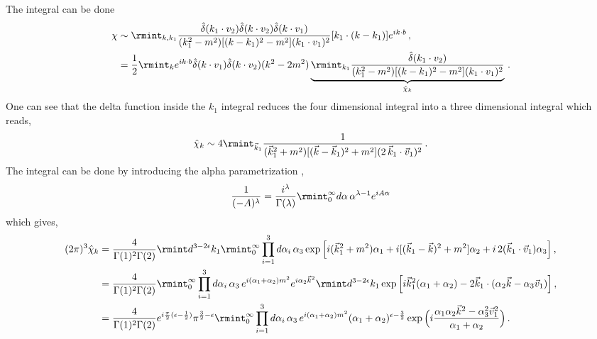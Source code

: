 The integral can be done 
\begin{align}
    \begin{split}
\chi&\sim\rmint_{k,k_1}\frac{\hat\delta(k_1\cdot v_2)\hat\delta(k\cdot v_2)\hat\delta(k\cdot v_1)}{(k_1^2-m^2)[(k-k_1)^2-m^2](k_1\cdot v_1)^2}[k_1\cdot(k-k_1)]e^{ik\cdot b}\,,\\ &
        =\frac{1}{2}\rmint_{k} e^{ik\cdot b}{\hat\delta(k\cdot v_1)\hat\delta(k\cdot v_2)}(k^2-2m^2)\underbrace{\rmint_{k_1}\frac{\hat\delta (k_1\cdot v_2)}{(k_1^2-m^2)[(k-k_1)^2-m^2](k_1\cdot v_1)^2}}_{\hat\chi_{k}}\,.\label{B.8a}
    \end{split}
\end{align}
One can see that the delta function inside the $k_1$ integral reduces the four dimensional integral into a three dimensional integral which reads,
\begin{align}
    \begin{split}
        \hat\chi_{k}\sim 4\rmint_{\vec k_1} \frac{1}{(\vec k_1^2+m^2)[(\vec k-\vec k_1)^2+m^2](2\,\vec k_1\cdot \vec v_1)^2}\,.\label{B.9c}
    \end{split}
\end{align}
The integral can be done by introducing the alpha parametrization \cite{smirnov2}, 
\begin{align}
    \frac{1}{(-A)^\lambda}=\frac{i^\lambda}{\Gamma(\lambda)}\rmint_{0}^{\infty}d\alpha \, \alpha^{\lambda-1}e^{iA\alpha}
\end{align}
which gives,
\begin{align}
    \begin{split}
      (2\pi)^3  \hat\chi_{k}&=\frac{4}{\Gamma(1)^2\Gamma(2)}\rmint d^{3-2\epsilon}k_1\rmint_0^\infty  \prod_{i=1}^3 d\alpha_i\,\alpha_3 \exp\Big[i( \vec k_1^2+m^2)\alpha_1+i[(\vec k_1-\vec k)^2+m^2]\alpha_2 +i\,2(\vec k_1\cdot \vec v_1)\alpha_3\Big]\,,\\ &
        =\frac{4}{\Gamma(1)^2\Gamma(2)}\rmint_0^\infty \prod_{i=1}^3 d\alpha_i\,\alpha_3\,e^{i(\alpha_1+\alpha_2)m^2}e^{i\alpha_2\vec k^2}\rmint d^{3-2\epsilon}k_1\exp\Big[i\vec k_1^2(\alpha_1+\alpha_2)-2\vec k_1\cdot (\alpha_2 \vec k-\alpha_3 \vec v_1)\Big]\,,\\ &
        =\frac{4}{\Gamma(1)^2\Gamma(2)}e^{i\frac{\pi}{2}(\epsilon-\frac{1}{2})}\pi^{\frac{3}{2}-\epsilon}\rmint_0^\infty  \prod_{i=1}^3 d\alpha_i\,\alpha_3\,e^{i(\alpha_1+\alpha_2)m^2}(\alpha_1+\alpha_2)^{\epsilon-\frac{3}{2}}\exp\Big(i\frac{\alpha_1\alpha_2\vec k^2-\alpha_3^2\vec v_1^2}{\alpha_1+\alpha_2}\Big)\,.
    \end{split}
\end{align}
